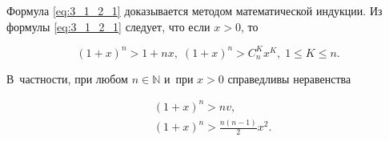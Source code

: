 \begin{enumerate}
\noindent
Формула \eqref{eq:3_1_2_1} доказывается методом математической индукции.
Из формулы \eqref{eq:3_1_2_1} следует, что если $x > 0$, то

\begin{equation*}
(1 + x)^{n} > 1 + nx, \;
(1 + x)^{n} > C_{n}^{K}x^{K}, \;
1 \leqslant K \leqslant n.
\end{equation*}

\noindent
В~частности, при любом $n \in \mathbb{N}$ и~при $x > 0$ справедливы неравенства

\begin{align}
& (1 + x)^{n} > nv, \\
& \displaystyle  (1 + x)^{n} > \frac{n(n-1)}{2}x^{2}.
\end{align}
\end{enumerate}

